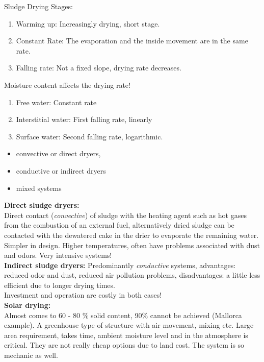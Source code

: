 \documentclass[12pt]{article}
\begin{document}
Sludge Drying Stages:
\begin{enumerate}
    \item Warming up: Increasingly drying, short stage.
    \item Constant Rate: The evaporation and the inside movement are in the same rate.
    \item Falling rate: Not a fixed slope, drying rate decreases.
\end{enumerate}
Moisture content affects the drying rate!
\begin{enumerate}
    \item Free water: Constant rate
    \item Interstitial water: First falling rate, linearly
    \item Surface water: Second falling rate, logarithmic.
\end{enumerate}
\begin{itemize}
    \item convective or direct dryers,
    \item conductive or indirect dryers
    \item mixed systems
\end{itemize}
\textbf{Direct sludge dryers:}\\
Direct contact (\textsl{convective}) of sludge with the heating agent such as hot gases from the combustion of an external fuel, alternatively dried sludge can be contacted with the dewatered cake in the drier to evaporate the remaining water.\\
Simpler in design. Higher temperatures, often have problems associated with dust and odors. Very intensive systems!\\
\textbf{Indirect sludge dryers:}
Predominantly \textsl{conductive} systems, advantages: reduced odor and dust, reduced air pollution problems, disadvantages: a little less efficient due to longer drying times.\\
Investment and operation are costly in both cases!\\
\textbf{Solar drying:}\\
Almost comes to 60 - 80 \% solid content, 90\% cannot be achieved (Mallorca example). A greenhouse type of structure with air movement, mixing etc. Large area requirement, takes time, ambient moisture level and in the atmosphere is critical. They are not really cheap options due to land cost. The system is so mechanic as well.
\end{document}

